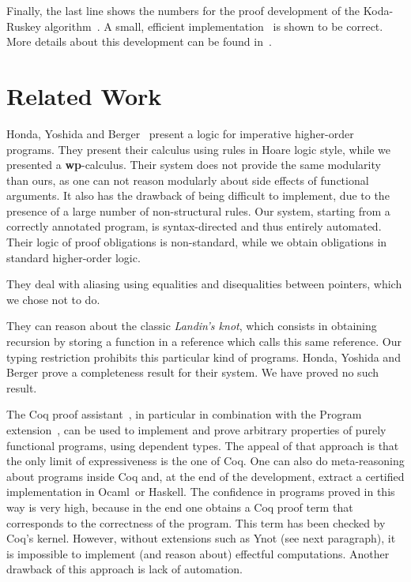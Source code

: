 \documentclass[a4paper]{llncs}
\newcommand{\wpre}{{\bf wp}}
\newcommand{\ocaml}{Ocaml}
\begin{document}
Finally, the last line shows the numbers for the proof development of the
Koda-Ruskey algorithm~\cite{KodaRuskey93}. A small, efficient
implementation~\cite{FilliatrePottier02} is shown to be correct. More details
about this development can be found in~\cite{KanigFilliatre09wml}.

\section{Related Work}
\label{sec:related}

Honda, Yoshida and
Berger~\cite{Honda05anobservationally,BergerHondaYoshida05aliasing} present a
logic for imperative higher-order programs. They present their calculus using
rules in Hoare logic style, while we presented a \wpre-calculus. Their system
does not provide the same modularity than ours, as one can not reason
modularly about side effects of functional arguments. It also has the drawback
of being difficult to implement, due to the presence of a large number of
non-structural rules. Our system, starting from a correctly annotated program,
is syntax-directed and thus entirely automated. Their logic of proof
obligations is non-standard, while we obtain obligations in standard higher-order
logic. 

They deal with aliasing using equalities and disequalities between
pointers, which we chose not to do. 

They can reason about the classic {\em
Landin's knot}, which consists in obtaining recursion by storing a function in
a reference which calls this same reference. Our typing restriction prohibits
this particular kind of programs.  Honda, Yoshida and Berger prove a
completeness result for their system. We have proved no such result.


The Coq proof assistant~\cite{CoqManualV81}, in particular in combination with
the Program extension~\cite{sozeau07icfp}, can be used to implement and prove
arbitrary properties of purely functional programs, using dependent types. The
appeal of that approach is that the only limit of expressiveness is the one of
Coq. One can also do meta-reasoning about programs inside Coq and, at the end
of the development, extract a certified implementation in \ocaml\ or Haskell.
The confidence in programs proved in this way is very high, because in the end
one obtains a Coq proof term that corresponds to the correctness of the
program. This term has been checked by Coq's kernel. However, without
extensions such as Ynot (see next paragraph), it is impossible to implement
(and reason about) effectful computations. Another drawback of this approach
is lack of automation.
\end{document}
